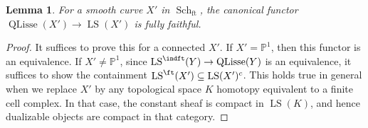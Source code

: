 \documentclass[10pt]{amsart}
\newtheorem{lemma}[subsubsection]{Lemma}
\theoremstyle{remark}
\newcommand{\pjl}{\mathbb{P}^1}
\newcommand{\on}{\operatorname}
\newcommand{\LS}{\on{LS}}
\newcommand{\QLisse}{\on{QLisse}}
\newcommand{\Schft}{\on{Sch}_{\on{ft}}}
\begin{document}
\begin{lemma}\label{lem: QL to LS containment}
    For a smooth curve $X'$ in $\Schft$, the canonical functor $\QLisse(X')\rightarrow \LS(X')$ is fully faithful.
\end{lemma}
\begin{proof}
    It suffices to prove this for a connected $X'$. If $X'=\pjl$, then this functor is an equivalence. If $X'\ne\pjl$, since $\LS^{\indft}(Y)\rightarrow \QLisse(Y)$ is an equivalence, it suffices to show the containment
    $\LS^{\ft}(X')\subseteq \LS(X')^c$.
    This holds true in general when we replace $X'$ by any topological space $K$ homotopy equivalent to a finite cell complex. In that case, the constant sheaf is compact in $\LS(K)$, and hence dualizable objects are compact in that category. \end{proof}
\end{document}
